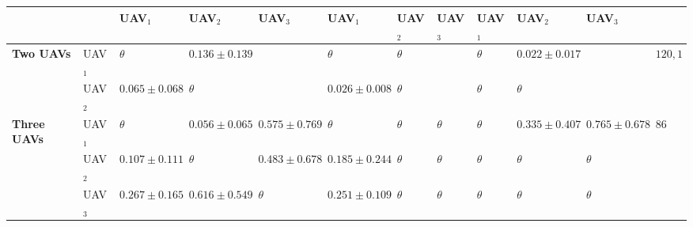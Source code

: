 \documentclass[11pt,openany]{book}
\begin{document}
\begin{algorimth}[H]
\begin{table}[H]
\begin{tabular}{|p{0.8cm}|p{0.7cm}|p{0.7cm}|p{0.7cm}|p{0.7cm}|p{0.7cm}|p{0.7cm}|p{0.7cm}|p{0.7cm}|p{0.7cm}|p{0.7cm}|p{1cm}|}
        \multicolumn{2}{|l|}{}                                 & UAV$_1$                                                                  & UAV$_2$                                                                  & UAV$_3$                                                                  & UAV$_1$                           & UAV$_2$           & UAV$_3$  & UAV$_1$  & UAV$_2$  & UAV$_3$           &                                           \\\hline
        \multirow{2}{0.8cm}{\textbf{Two UAVs}}                 & UAV$_1$                                                                  & $\theta$                                                                 & $0.136\pm 0.139$                                                         &                                   & $\theta$          & $\theta$ &          & $\theta$ & $0.022 \pm 0.017$ &                   & $120,1$               \\\cline{2-11}
                                                               & UAV$_2$                                                                  & $0.065 \pm 0.068$                                                        & $\theta$                                                                 &                                   & $0.026 \pm 0.008$ & $\theta$ &          & $\theta$ & $\theta$          &                   &                       \\\hline
        \multirow{3}{0.8cm}{\textbf{Three UAVs}}               & UAV$_1$                                                                  & $\theta$                                                                 & $0.056 \pm 0.065$                                                        & $0.575 \pm 0.769$                 & $\theta$          & $\theta$ & $\theta$ & $\theta$ & $0.335 \pm 0.407$ & $0.765 \pm 0.678$ & \multirow{3}{1cm}{86} \\\cline{2-11}
                                                               & UAV$_2$                                                                  & $0.107 \pm 0.111$                                                        & $\theta$                                                                 & $0.483 \pm 0.678$                 & $0.185 \pm 0.244$ & $\theta$ & $\theta$ & $\theta$ & $\theta$          & $\theta$          &                       \\\cline{2-11}
                                                               & UAV$_3$                                                                  & $0.267 \pm 0.165$                                                        & $0.616 \pm 0.549$                                                        & $\theta$                          & $0.251 \pm 0.109$ & $\theta$ & $\theta$ & $\theta$ & $\theta$          & $\theta$          &                       \\\hline
    \end{tabular}
\end{table}

\end{algorimth}
\end{document}
